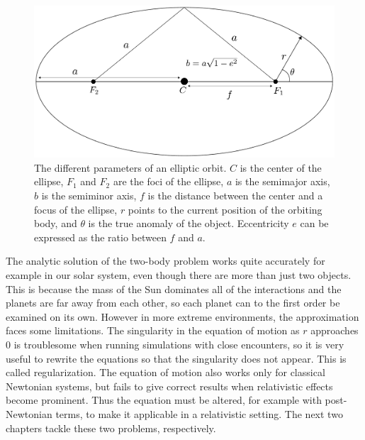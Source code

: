 \documentclass[english, oneside]{HYgradu}
\begin{document}
\begin{figure}[h!tb]
\centering
\includegraphics[width=\textwidth]{../images/ellipse.pdf}
\caption{The different parameters of an elliptic orbit. $C$ is the center of the ellipse, $F_1$ and $F_2$ are the foci of the ellipse, $a$ is the semimajor axis, $b$ is the semiminor axis, $f$ is the distance between the center and a focus of the ellipse, $r$ points to the current position of the orbiting body, and $\theta$ is the true anomaly of the object. Eccentricity $e$ can be expressed as the ratio between $f$ and $a$.}
\label{fig:ellipse}
\end{figure}

The analytic solution of the two-body problem works quite accurately for example in our solar system, even though there are more than just two objects. This is because the mass of the Sun dominates all of the interactions and the planets are far away from each other, so each planet can to the first order be examined on its own. However in more extreme environments, the approximation faces some limitations. The singularity in the equation of motion as $r$ approaches 0 is troublesome when running simulations with close encounters, so it is very useful to rewrite the equations so that the singularity does not appear. This is called regularization. The equation of motion also works only for classical Newtonian systems, but fails to give correct results when relativistic effects become prominent. Thus the equation must be altered, for example with post-Newtonian terms, to make it applicable in a relativistic setting. The next two chapters tackle these two problems, respectively.

\end{document}
